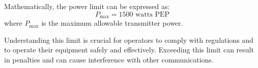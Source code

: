 Mathematically, the power limit can be expressed as:
\[
P_{\text{max}} = 1500 \text{ watts PEP}
\]
where \( P_{\text{max}} \) is the maximum allowable transmitter power.

Understanding this limit is crucial for operators to comply with regulations and to operate their equipment safely and effectively. Exceeding this limit can result in penalties and can cause interference with other communications.

